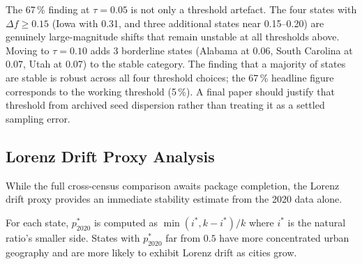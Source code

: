 The 67\,\% finding at $\tau = 0.05$ is not only a threshold artefact.
The four states with $\Delta f \geq 0.15$ (Iowa with 0.31,
and three additional states near 0.15--0.20) are genuinely large-magnitude
shifts that remain unstable at all thresholds above.
Moving to $\tau = 0.10$ adds 3 borderline states (Alabama at 0.06,
South Carolina at 0.07, Utah at 0.07) to the stable category.
The finding that a majority of states are stable is robust across all
four threshold choices; the 67\,\% headline figure corresponds to the
working threshold (5\,\%).  A final paper should justify that threshold from
archived seed dispersion rather than treating it as a settled sampling error.

\subsection{Lorenz Drift Proxy Analysis}
\label{sec:lorenz-analysis}

While the full cross-census comparison awaits package completion,
the Lorenz drift proxy provides an immediate stability estimate from the 2020
data alone.

For each state, $p^*_{2020}$ is computed as $\min(i^*, k-i^*)/k$ where
$i^*$ is the natural ratio's smaller side.
States with $p^*_{2020}$ far from $0.5$ have more concentrated urban geography
and are more likely to exhibit Lorenz drift as cities grow.

